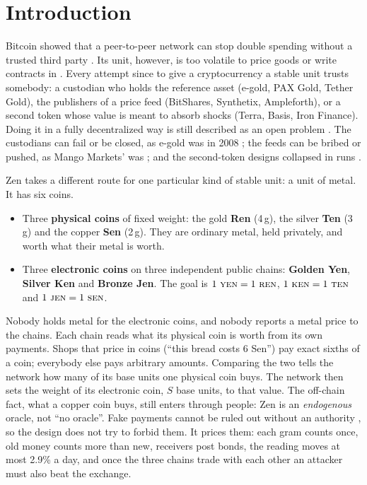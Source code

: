 \section{Introduction}

Bitcoin showed that a peer-to-peer network can stop double spending without a trusted third party \cite{nakamoto}. Its unit, however, is too volatile to price goods or write contracts in \cite{yermack}. Every attempt since to give a cryptocurrency a stable unit trusts somebody: a custodian who holds the reference asset (e-gold, PAX Gold, Tether Gold), the publishers of a price feed (BitShares, Synthetix, Ampleforth), or a second token whose value is meant to absorb shocks (Terra, Basis, Iron Finance). Doing it in a fully decentralized way is still described as an open problem \cite{klagesmundt,caldarelli}. The custodians can fail or be closed, as e-gold was in 2008 \cite{egold-doj}; the feeds can be bribed or pushed, as Mango Markets' was \cite{mango}; and the second-token designs collapsed in runs \cite{terra}.

Zen takes a different route for one particular kind of stable unit: a unit of metal. It has six coins.

\begin{itemize}
\item Three \textbf{physical coins} of fixed weight: the gold \textbf{Ren} (4\,g), the silver \textbf{Ten} (3\,g) and the copper \textbf{Sen} (2\,g). They are ordinary metal, held privately, and worth what their metal is worth.
\item Three \textbf{electronic coins} on three independent public chains: \textbf{Golden Yen}, \textbf{Silver Ken} and \textbf{Bronze Jen}. The goal is $1~\textsc{yen} = 1~\textsc{ren}$, $1~\textsc{ken} = 1~\textsc{ten}$ and $1~\textsc{jen} = 1~\textsc{sen}$.
\end{itemize}

Nobody holds metal for the electronic coins, and nobody reports a metal price to the chains. Each chain reads what its physical coin is worth from its own payments. Shops that price in coins (``this bread costs 6 Sen'') pay exact sixths of a coin; everybody else pays arbitrary amounts. Comparing the two tells the network how many of its base units one physical coin buys. The network then sets the weight of its electronic coin, $S$ base units, to that value. The off-chain fact, what a copper coin buys, still enters through people: Zen is an \emph{endogenous} oracle, not ``no oracle''. Fake payments cannot be ruled out without an authority \cite{douceur}, so the design does not try to forbid them. It prices them: each gram counts once, old money counts more than new, receivers post bonds, the reading moves at most 2.9\% a day, and once the three chains trade with each other an attacker must also beat the exchange.

